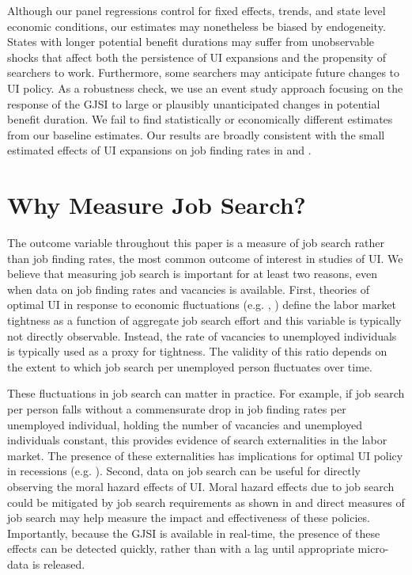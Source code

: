 \documentclass[12pt]{article}
\begin{document}
\begin{spacing}{2}
Although our panel regressions control for fixed effects, trends, and state level economic conditions, our estimates may nonetheless be biased by endogeneity. States with longer potential benefit durations may suffer from unobservable shocks that affect both the persistence of UI expansions and the propensity of searchers to work. Furthermore, some searchers may anticipate future changes to UI policy. As a robustness check, we use an event study approach focusing on the response of the GJSI to large or plausibly unanticipated changes in potential benefit duration. We fail to find statistically or economically different estimates from our baseline estimates. Our results are broadly consistent with the small estimated effects of UI expansions on job finding rates in \citet{Rothstein2011} and \citet{Farber2013}.



\section{Why Measure Job Search?}
The outcome variable throughout this paper is a measure of job search rather than job finding rates, the most common outcome of interest in studies of UI. We believe that measuring job search is important for at least two reasons, even when data on job finding rates and vacancies is available. First, theories of optimal UI in response to economic fluctuations (e.g. \citet{Landais2015}, \citet{Schmieder2012}) define the labor market tightness as a function of aggregate job search effort and this variable is typically not directly observable. Instead, the rate of vacancies to unemployed individuals is typically used as a proxy for tightness. The validity of this ratio depends on the extent to which job search per unemployed person fluctuates over time.

These fluctuations in job search can matter in practice. For example, if job search per person falls without a commensurate drop in job finding rates per unemployed individual, holding the number of vacancies and unemployed individuals constant, this provides evidence of search externalities in the labor market. The presence of these externalities has implications for optimal UI policy in recessions (e.g. \citet{Landais2015}). Second, data on job search can be useful for directly observing the moral hazard effects of UI. Moral hazard effects due to job search could be mitigated by job search requirements as shown in \citet{Lachowska2015} and direct measures of job search may help measure the impact and effectiveness of these policies. Importantly, because the GJSI is available in real-time, the presence of these effects can be detected quickly, rather than with a lag until appropriate micro-data is released.


\end{spacing}
\end{document}
